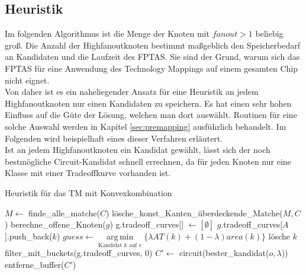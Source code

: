 \documentclass[11pt, a4paper, german]{article}
\DeclareMathOperator*{\argmin}{arg\,min}
\begin{document}
\subsection{Heuristik}
\label{subsec:heuristik}
Im folgenden Algorithmus ist die Menge der Knoten mit $fanout > 1$ beliebig groß.
Die Anzahl der Highfanoutknoten bestimmt maßgeblich den Speicherbedarf an Kandidaten und die Laufzeit des FPTAS. Sie sind der Grund, warum sich das FPTAS für eine Anwendung des Technology Mappings auf einem gesamten Chip nicht eignet. \\
Von daher ist es ein naheliegender Ansatz für eine Heuristik an jedem Highfanoutknoten nur einen Kandidaten zu speichern. Es hat einen sehr hohen Einfluss auf die Güte der Lösung, welchen man dort auswählt. Routinen für eine solche Auswahl werden in Kapitel \ref{sec:premapping} ausführlich behandelt. Im Folgenden wird beispielhaft eines dieser Verfahren erläutert. \\
Ist an jedem Highfanoutknoten ein Kandidat gewählt, lässt sich der noch bestmögliche Circuit-Kandidat schnell errechnen, da für jeden Knoten nur eine Klasse mit einer Tradeoffkurve vorhanden ist.\\

\LinesNumbered
\begin{algorithm}[H]
\DontPrintSemicolon
\caption{Heuristik f\"ur das TM mit Konvexkombination}

   $M \gets$ finde\_alle\_matche($C$)\;
   lösche\_konst\_Kanten\_überdeckende\_Matche($M, C$)\;
        {
			berechne\_offene\_Knoten($g$)\;	 
        }
  {
    g.tradeoff\_curves[] $\gets [\emptyset]$\;
    {
      {
        {
        	 {
			$g$.tradeoff\_curves[$A$].push\_back($k$)\;      	 
        	 }  
        }
      }
    }
  {
    $guess \gets \argmin\limits_{\text{Kandidat }k\text{ auf }v}\{ \lambda AT(k) + (1-\lambda) area(k)  \}$\;
    {
      {
	l\"osche $k$\;
      }
    }
  }    
    filter\_mit\_buckets(g.tradeoff\_curves, 0)\;    
  }
  $C' \gets $ circuit(bester\_kandidat($o, \lambda$))\;
  \Return entferne\_buffer($C'$)\;
\end{algorithm}\ \\
\end{document}
